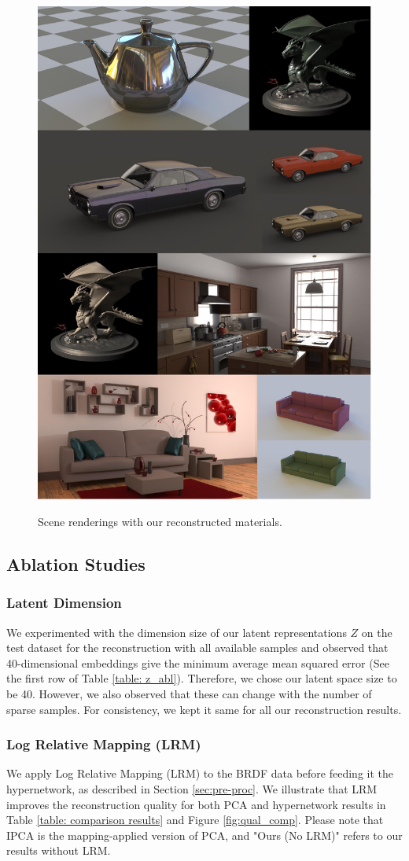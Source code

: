 \begin{figure}[ht]
  \centering
  {\includegraphics[width=0.7\linewidth]{Chapters/hyperbrdf-figs/SceneRenderings1.pdf}}
   \caption{Scene renderings with our reconstructed materials.}
   \label{fig:scene-render}
\end{figure}

\subsection{Ablation Studies}\label{sec:abl}
\subsubsection{Latent Dimension}
We experimented with the dimension size of our latent representations $Z$ on the test dataset for the reconstruction with all available samples and observed that 40-dimensional embeddings give the minimum average mean squared error (See the first row of Table \ref{table: z_abl}). Therefore, we chose our latent space size to be 40. However, we also observed that these can change with the number of sparse samples. For consistency, we kept it same for all our reconstruction results. 

\subsubsection{Log Relative Mapping (LRM)}\label{sec:lrm}
We apply Log Relative Mapping (LRM) \cite{nielsen2015optimal} to the BRDF data before feeding it the hypernetwork, as described in Section \ref{sec:pre-proc}. We illustrate that LRM improves the reconstruction quality for both PCA and hypernetwork results in Table \ref{table: comparison results} and Figure \ref{fig:qual_comp}. Please note that IPCA is the mapping-applied version of PCA, and "Ours (No LRM)" refers to our results without LRM.


